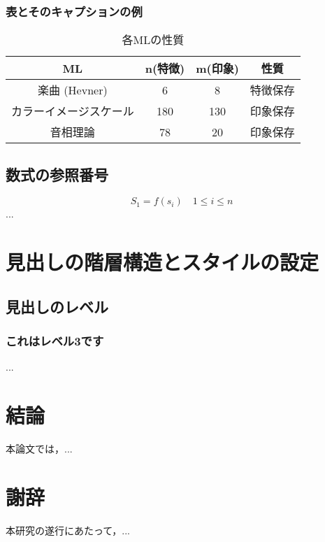 \documentclass[titlepage,12pt]{ltjsarticle}
\begin{document}
\subsubsection{表とそのキャプションの例}\label{subsubsec:table}
\begin{table}[htbp]
    \centering
    \begin{tabular}{|c|c|c|c|}
        \hline
        ML & n(特徴) & m(印象) & 性質 \\ \hline
        楽曲 (Hevner) & 6 & 8 & 特徴保存 \\ \hline
        カラーイメージスケール & 180 & 130 & 印象保存 \\ \hline
        音相理論 & 78 & 20 & 印象保存 \\ \hline
    \end{tabular}
    \caption{各MLの性質}
    \label{tab:ml_properties}
\end{table}

\subsection{数式の参照番号}
\begin{equation}\label{eq:feature}
    S_1 = f(s_i) \quad 1 \leq i \leq n
\end{equation}
...

\section{見出しの階層構造とスタイルの設定}\label{sec:hierarchy_style}
\subsection{見出しのレベル}\label{subsec:level}
\subsubsection{これはレベル3です}\label{subsubsec:level3}
...

\section{結論}\label{sec:conclusion}
本論文では，...

\section*{謝辞}
本研究の遂行にあたって，...


\end{document}
